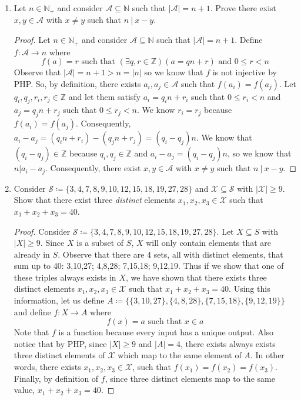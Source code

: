 \documentclass{article}
\newcommand{\defeq}{\coloneqq}
\newcommand{\naturals}{\mathbb{N}}
\newcommand{\divides}{\:\mathbb{|}\: }
\newcommand{\integers}{\mathbb{Z}}
\begin{document}
\begin{enumerate}
  \item
    Let $n \in \naturals_+$ and consider $\mathcal{A} \subseteq \naturals$ such that $|\mathcal{A}| = n + 1$.
    Prove there exist $x, y \in \mathcal{A}$ with $x \neq y$ such that $n \divides x - y$.
    \begin{proof}
        Let $n \in \naturals_+$ and consider $\mathcal{A} \subseteq \naturals$ such that $|\mathcal{A}| = n + 1$. Define $f:\mathcal{A} \to n$ where 
        \[f(a)= r \text{ such that } (\exists q,r \in \integers)(a=qn+r)\text{ and } 0 \leq r < n\] 
        Observe that $|\mathcal{A}|=n+1>n=|n|$ so we know that $f$ is not injective by PHP. So, by definition, there exists $a_i,a_j \in \mathcal{A}$ such that $f(a_i)=f(a_j)$. Let $q_i,q_j,r_i,r_j\in \integers$ and let them satisfy $a_i=q_in+r_i$ such that $0 \leq r_i < n$ and $a_j=q_jn+r_j$ such that $0 \leq r_j < n$. We know $r_i=r_j$ because $f(a_i)=f(a_j)$. Consequently, $a_i-a_j=(q_in+r_i)-(q_jn+r_j)=(q_i-q_j)n$. We know that $(q_i-q_j) \in \integers$ because $q_i,q_j \in \integers$ and $a_i-a_j=(q_i-q_j)n$, so we know that $n|a_i-a_j$. Consequently, there exist $x, y \in \mathcal{A}$ with $x \neq y$ such that $n \divides x - y$.
    \end{proof}
\pagebreak
  \item
    Consider $\mathcal{S} \defeq \{3, 4, 7, 8, 9, 10, 12, 15, 18, 19, 27, 28\}$ and $\mathcal{X} \subseteq \mathcal{S}$ with $|\mathcal{X}| \geq 9$.
    Show that there exist three \emph{distinct} elements $x_1, x_2, x_3 \in \mathcal{X}$ such that $x_1 + x_2 + x_3 = 40$.
    \begin{proof}
        Consider $\mathcal{S} \defeq \{3, 4, 7, 8, 9, 10, 12, 15, 18, 19, 27, 28\}$. Let $X \subseteq S$ with $|X| \geq 9$. Since $X$ is a subset of $S$, $X$ will only contain elements that are already in $S$. Observe that there are 4 sets, all with distinct elements, that sum up to 40: 3,10,27; 4,8,28; 7,15,18; 9,12,19. Thus if we show that one of these triples always exists in $X$, we have shown that there exists three distinct elements $x_1, x_2, x_3 \in \mathcal{X}$ such that $x_1 + x_2 + x_3 = 40$. Using this information, let us define $A \defeq \{\{3,10,27\}, \{4,8,28\}, \{7,15,18\}, \{9,12,19\}\}$ and define $f: X \to A$ where 
        \[ f(x)= a \text{ such that } x \in a\]
        Note that $f$ is a function because every input has a unique output. Also notice that by PHP, since $|X| \geq 9$ and $|A| = 4$, there exists always exists three distinct elements of $\mathcal{X}$ which map to the same element of $A$. In other words, there exists $x_1,x_2,x_3 \in \mathcal{X}$, such that $f(x_1)=f(x_2)=f(x_3)$. Finally, by definition of $f$, since three distinct elements map to the same value, $x_1 + x_2 + x_3 = 40$.
    \end{proof}
    

\end{enumerate}
\end{document}
